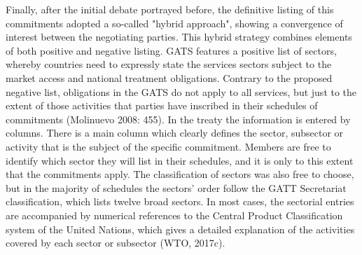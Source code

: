 \documentclass{article}
\begin{document}
\smallskip

Finally, after the initial debate portrayed before, the definitive listing of this commitments adopted a so-called "hybrid approach", showing a convergence of interest between the negotiating parties. This hybrid strategy combines elements of both positive and negative listing. GATS features a positive list of sectors, whereby countries need to expressly state the services sectors subject to the market access and national treatment obligations. Contrary to the proposed negative list, obligations in the GATS do not apply to all services, but just to the extent of those activities that parties have inscribed in their schedules of commitments (Molinuevo 2008: 455). In the treaty the information is entered by columns. There is a main column which clearly defines the sector, subsector or activity that is the subject of the specific commitment. Members are free to identify which sector they will list in their schedules, and it is only to this extent that the commitments apply. The classification of sectors was also free to choose, but in the majority of schedules the sectors’ order follow the GATT Secretariat classification, which lists twelve broad sectors. In most cases, the sectorial entries are accompanied by numerical references to the Central Product Classification system of the United Nations, which gives a detailed explanation of the activities covered by each sector or subsector (WTO, 2017c).

\smallskip
\end{document}
